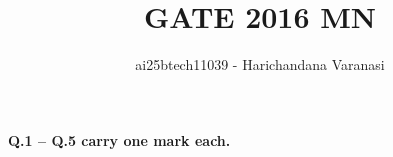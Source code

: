 \documentclass[journal]{IEEEtran}
\begin{document}

\vspace{3cm}


\title{GATE 2016 MN }
\author{ai25btech11039
- Harichandana Varanasi}
\maketitle
{\let\newpage\relax\maketitle}

\renewcommand{\thefigure}{\theenumi}
\renewcommand{\thetable}{\theenumi}
\setlength{\intextsep}{10pt} %
\noindent\textbf{Q.1 -- Q.5 carry one mark each.}
\vspace{0.5em}
\end{document}
